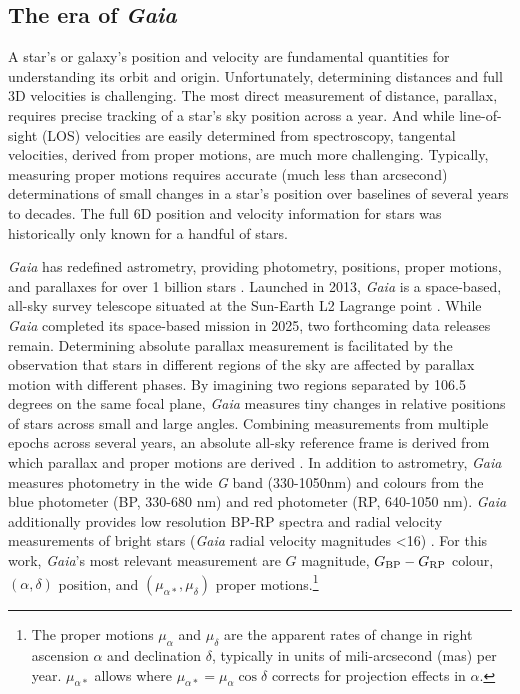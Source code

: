 \subsection{\texorpdfstring{The era of
\emph{Gaia}}{The era of Gaia}}\label{the-era-of-gaia}

A star's or galaxy's position and velocity are fundamental quantities
for understanding its orbit and origin. Unfortunately, determining
distances and full 3D velocities is challenging. The most direct
measurement of distance, parallax, requires precise tracking of a star's
sky position across a year. And while line-of-sight (LOS) velocities are
easily determined from spectroscopy, tangental velocities, derived from
proper motions, are much more challenging. Typically, measuring proper
motions requires accurate (much less than arcsecond) determinations of
small changes in a star's position over baselines of several years to
decades. The full 6D position and velocity information for stars was
historically only known for a handful of stars.

\emph{Gaia} has redefined astrometry, providing photometry, positions,
proper motions, and parallaxes for over 1 billion stars
\citep{gaialcollaboration+2021}. Launched in 2013, \emph{Gaia} is a
space-based, all-sky survey telescope situated at the Sun-Earth L2
Lagrange point \citep{gaiacollaboration+2016}. While \emph{Gaia}
completed its space-based mission in 2025, two forthcoming data releases
remain. Determining absolute parallax measurement is facilitated by the
observation that stars in different regions of the sky are affected by
parallax motion with different phases. By imagining two regions
separated by 106.5 degrees on the same focal plane, \emph{Gaia} measures
tiny changes in relative positions of stars across small and large
angles. Combining measurements from multiple epochs across several
years, an absolute all-sky reference frame is derived from which
parallax and proper motions are derived \citep{gaiacollaboration+2016}.
In addition to astrometry, \emph{Gaia} measures photometry in the wide
\emph{G} band (330-1050nm) and colours from the blue photometer (BP,
330-680 nm) and red photometer (RP, 640-1050 nm). \emph{Gaia}
additionally provides low resolution BP-RP spectra and radial velocity
measurements of bright stars (\emph{Gaia} radial velocity magnitudes
\textless16) \citep{gaiacollaboration+2016}. For this work,
\emph{Gaia}'s most relevant measurement are \(G\) magnitude,
\(G_{\rm BP} - G_{\rm RP}\) colour, \((\alpha, \delta)\) position, and
\((\mu_{\alpha*}, \mu_\delta)\) proper motions.\footnote{The proper
  motions \(\mu_\alpha\) and \(\mu_\delta\) are the apparent rates of
  change in right ascension \(\alpha\) and declination \(\delta\),
  typically in units of mili-arcsecond (mas) per year. \(\mu_{\alpha*}\)
  allows where \(\mu_{\alpha*} = \mu_\alpha \cos \delta\) corrects for
  projection effects in \(\alpha\).}

